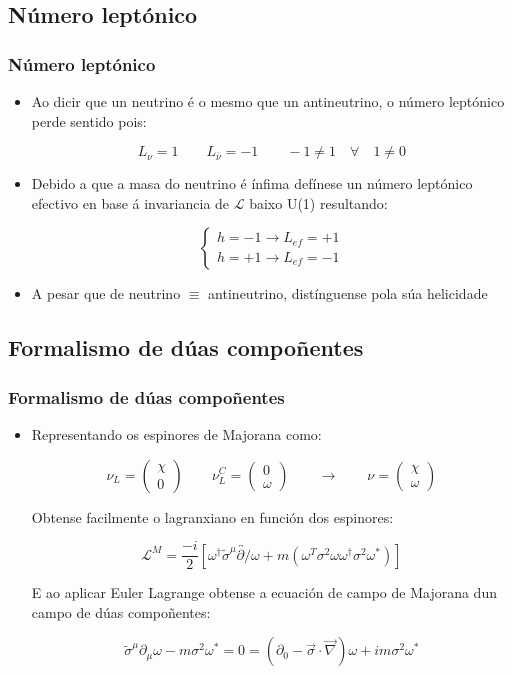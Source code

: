 \documentclass[10pt]{beamer}
\newcommand{\beq}{\begin{equation}}
\newcommand{\eeq}{\end{equation}}
\newcommand{\bi}{\begin{itemize}}
\newcommand{\ei}{\end{itemize}}
\newcommand{\bc}{\begin{cases}}
\newcommand{\ec}{\end{cases}}
\newcommand{\bmx}{\left(\begin{array}}
\newcommand{\emx}{\end{array}\right)}
\newcommand{\barra}[1]{\overline{#1}}
\newcommand{\h}[1]{#1^\dagger}
\newcommand{\rvec}[1]{\overrightarrow{#1}}
\newcommand{\dvec}[1]{\overleftrightarrow{#1}}
\newcommand{\chula}[1]{\mathcal{#1}}
\newcommand{\slx}[1]{ #1\!\!\!/ }
\begin{document}
\subsection{Número leptónico}

\begin{frame} \frametitle{Número leptónico}
\bi

\item Ao dicir que un neutrino é o mesmo que un antineutrino, o número leptónico perde sentido pois:

\beq
 L_\nu = 1 \qquad L_{\barra\nu}=-1 \qquad -1 \neq 1 \quad \forall \quad 1 \neq 0 \nonumber
\eeq

\item Debido a que a masa do neutrino é ínfima defínese un número leptónico efectivo en base á invariancia de $\chula L$ baixo U(1) resultando:

\beq
\bc
h=-1 \rightarrow L_{ef} = +1 \\
h=+1 \rightarrow L_{ef} = -1
\ec \nonumber
\eeq

\item A pesar que de neutrino $\equiv$ antineutrino, distínguense pola súa helicidade
\ei
\end{frame}

\subsection{Formalismo de dúas compoñentes}

\begin{frame} \frametitle{Formalismo de dúas compoñentes}
\bi

\item Representando os espinores de Majorana como:

\beq
\nu_L = \bmx{c} \chi \\ 0 \emx \qquad \nu_L^C = \bmx{c} 0 \\ \omega \emx \qquad \rightarrow \qquad \nu = \bmx{c} \chi \\ \omega \emx \nonumber
\eeq

Obtense facilmente o lagranxiano en función dos espinores:

\beq
\chula L^M = \frac{-i}{2} \left[ \h\omega \tilde\sigma^\mu \dvec{\slx\partial} \omega + m \left( \omega^T \sigma^2 \omega  \h\omega \sigma^2 \omega^* \right) \right] \nonumber
\eeq

E ao aplicar Euler Lagrange obtense a ecuación de campo de Majorana dun campo de dúas compoñentes:

\beq
\tilde\sigma^\mu \partial_\mu \omega - m \sigma^2 \omega^* = 0 = \left( \partial_0 - \rvec\sigma \cdot \rvec\nabla \right) \omega + im \sigma^2 \omega^* \nonumber
\eeq

\ei
\end{frame}
\end{document}
